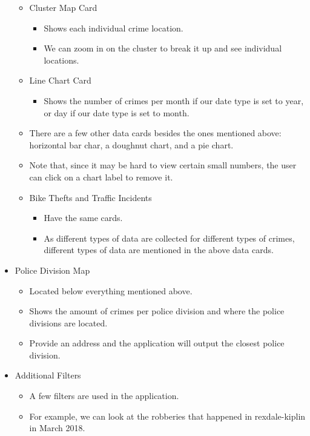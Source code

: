\documentclass[12pt, a4paper]{article}
\begin{document}
\begin{itemize}
\begin{itemize}
        \item Cluster Map Card
        \begin{itemize}
            \item Shows each individual crime location. 
            \item We can zoom in on the cluster to break it up and see individual locations.
        \end{itemize}
        \item Line Chart Card
        \begin{itemize}
            \item Shows the number of crimes per month if our date type is set to year, or day if our date type is set to month.
        \end{itemize}
        \item There are a few other data cards besides the ones mentioned above: horizontal bar char, a doughnut chart, and a pie chart.
        \item Note that, since it may be hard to view certain small numbers, the user can click on a chart label to remove it.
        \item Bike Thefts and Traffic Incidents
        \begin{itemize}
            \item Have the same cards.
            \item As different types of data are collected for different types of crimes, different types of data are mentioned in the above data cards.
        \end{itemize}
    \end{itemize}
    \item Police Division Map
    \begin{itemize}
        \item Located below everything mentioned above. 
        \item Shows the amount of crimes per police division and where the police divisions are located.
        \item Provide an address and the application will output the closest police division.
    \end{itemize}
    \item Additional Filters
    \begin{itemize}
        \item A few filters are used in the application. 
        \item For example, we can look at the robberies that happened in rexdale-kiplin in March 2018.

\end{itemize}
\end{itemize}
\end{document}
